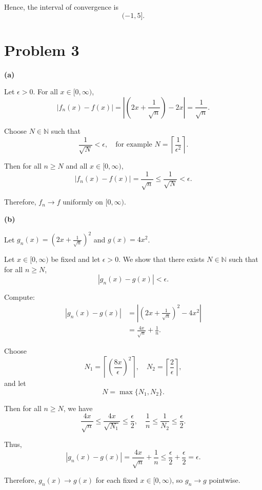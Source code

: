 \documentclass[12pt]{article}
\begin{document}
\medskip

Hence, the interval of convergence is
\[
(-1, 5].
\]

\section*{Problem 3}
\textbf{(a)} 

Let $\epsilon > 0$. For all $x \in [0,\infty)$,
\[
|f_n(x) - f(x)| 
= \left| \left(2x + \frac{1}{\sqrt{n}}\right) - 2x \right|
= \frac{1}{\sqrt{n}}.
\]

Choose $N \in \mathbb{N}$ such that
\[
\frac{1}{\sqrt{N}} < \epsilon,
\quad \text{for example } 
N = \left\lceil \frac{1}{\epsilon^2} \right\rceil.
\]

Then for all $n \ge N$ and all $x \in [0,\infty)$,
\[
|f_n(x) - f(x)| = \frac{1}{\sqrt{n}} \le \frac{1}{\sqrt{N}} < \epsilon.
\]

Therefore, $f_n \to f$ uniformly on $[0,\infty)$.

\bigskip

\textbf{(b)} 

Let $g_n(x) = \left(2x + \frac{1}{\sqrt{n}}\right)^2$ and $g(x) = 4x^2$.

Let $x \in [0,\infty)$ be fixed and let $\epsilon > 0$. We show that there exists $N \in \mathbb{N}$ such that for all $n \ge N$,
\[
|g_n(x) - g(x)| < \epsilon.
\]

Compute:
\begin{align*}
|g_n(x) - g(x)|
&= \left| \left(2x + \frac{1}{\sqrt{n}}\right)^2 - 4x^2 \right| \\
&= \frac{4x}{\sqrt{n}} + \frac{1}{n}.
\end{align*}

Choose
\[
N_1 = \left\lceil \left(\frac{8x}{\epsilon}\right)^2 \right\rceil,
\quad
N_2 = \left\lceil \frac{2}{\epsilon} \right\rceil,
\]
and let
\[
N = \max\{N_1, N_2\}.
\]

Then for all $n \ge N$, we have
\[
\frac{4x}{\sqrt{n}} \le \frac{4x}{\sqrt{N_1}} \le \frac{\epsilon}{2},
\quad
\frac{1}{n} \le \frac{1}{N_2} \le \frac{\epsilon}{2}.
\]

Thus,
\[
|g_n(x) - g(x)|
= \frac{4x}{\sqrt{n}} + \frac{1}{n}
\le \frac{\epsilon}{2} + \frac{\epsilon}{2}
= \epsilon.
\]

Therefore, $g_n(x) \to g(x)$ for each fixed $x \in [0,\infty)$, so $g_n \to g$ pointwise.

\bigskip
\end{document}
